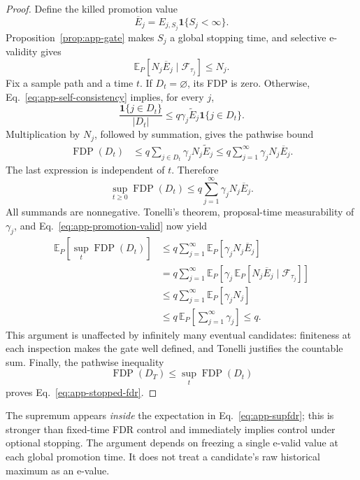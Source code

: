 \begin{proof}
Define the killed promotion value
\[
 \overline E_j
 =E_{j,S_j}\mathbf 1\{S_j<\infty\}.
\]
Proposition~\ref{prop:app-gate} makes \(S_j\) a global stopping time, and
selective e-validity gives
\begin{equation}
  \mathbb E_P[N_j\overline E_j\mid\mathcal F_{\tau_j}]
  \leq N_j.
  \label{eq:app-promotion-valid}
\end{equation}
Fix a sample path and a time \(t\).  If \(D_t=\varnothing\), its FDP is zero.
Otherwise, Eq.~\eqref{eq:app-self-consistency} implies, for every \(j\),
\[
 \frac{\mathbf 1\{j\in D_t\}}{|D_t|}
 \leq q\gamma_j\widetilde E_j\mathbf 1\{j\in D_t\}.
\]
Multiplication by \(N_j\), followed by summation, gives the pathwise bound
\begin{align}
 \operatorname{FDP}(D_t)
 &\leq q\sum_{j\in D_t}\gamma_jN_j\widetilde E_j
 \leq q\sum_{j=1}^{\infty}\gamma_jN_j\overline E_j.
 \label{eq:app-pathwise}
\end{align}
The last expression is independent of \(t\).  Therefore
\[
 \sup_{t\geq0}\operatorname{FDP}(D_t)
 \leq q\sum_{j=1}^{\infty}\gamma_jN_j\overline E_j.
\]
All summands are nonnegative.  Tonelli's theorem, proposal-time
measurability of \(\gamma_j\), and
Eq.~\eqref{eq:app-promotion-valid} now yield
\begin{align*}
 \mathbb E_P[\sup_t\operatorname{FDP}(D_t)]
 &\leq q\sum_{j=1}^{\infty}
    \mathbb E_P[\gamma_jN_j\overline E_j]\\
 &=q\sum_{j=1}^{\infty}
    \mathbb E_P\!\left[
      \gamma_j\,
      \mathbb E_P[N_j\overline E_j\mid\mathcal F_{\tau_j}]
    \right]\\
 &\leq q\sum_{j=1}^{\infty}\mathbb E_P[\gamma_jN_j]\\
 &\leq q\,\mathbb E_P\!\left[\sum_{j=1}^{\infty}\gamma_j\right]
 \leq q.
\end{align*}
This argument is unaffected by infinitely many eventual candidates:
finiteness at each inspection makes the gate well defined, and Tonelli
justifies the countable sum.  Finally, the pathwise inequality
\[
  \operatorname{FDP}(D_T)\leq\sup_t\operatorname{FDP}(D_t)
\]
proves Eq.~\eqref{eq:app-stopped-fdr}.
\end{proof}

The supremum appears \emph{inside} the expectation in
Eq.~\eqref{eq:app-supfdr}; this is stronger than fixed-time FDR control and
immediately implies control under optional stopping.  The argument depends
on freezing a single e-valid value at each global promotion time.  It does
not treat a candidate's raw historical maximum as an e-value.


